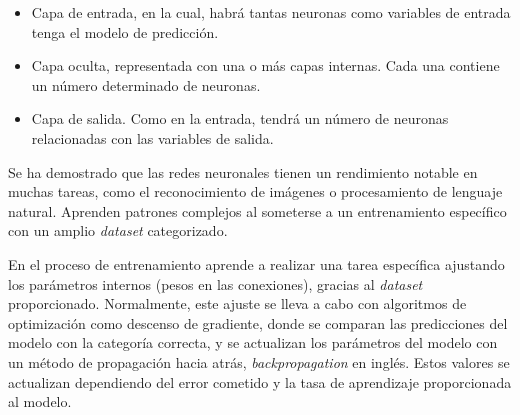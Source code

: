 		\begin{itemize}
			\item Capa de entrada, en la cual, habrá tantas neuronas como variables de entrada tenga el modelo de predicción.
			\vspace{-0.4cm} 
			\item Capa oculta, representada con una o más capas internas. Cada una contiene un número determinado de neuronas.
			\vspace{-0.4cm}	
			\item Capa de salida. Como en la entrada, tendrá un número de neuronas relacionadas con las variables de salida.
		\end{itemize}
		
		\vspace{-0.2cm}
		
		Se ha demostrado que las redes neuronales tienen un rendimiento notable en muchas tareas, como el reconocimiento de imágenes o procesamiento de lenguaje natural. Aprenden patrones complejos al someterse a un entrenamiento específico con un amplio \textit{dataset} categorizado.	
		
		
		En el proceso de entrenamiento aprende a realizar una tarea específica ajustando los parámetros internos (pesos en las conexiones), gracias al \textit{dataset} proporcionado. Normalmente, este ajuste se lleva a cabo con algoritmos de optimización como descenso de gradiente, donde se comparan las predicciones del modelo con la categoría correcta, y se actualizan los parámetros del modelo con un método de propagación hacia atrás, \textit{backpropagation} en inglés. Estos valores se actualizan dependiendo del error cometido y la tasa de aprendizaje proporcionada al modelo.



